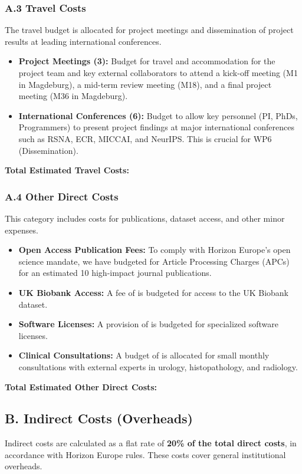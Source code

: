 \subsubsection*{A.3 Travel Costs}
The travel budget is allocated for project meetings and dissemination of project results at leading international conferences.
\begin{itemize}
    \item \textbf{Project Meetings (3):} Budget for travel and accommodation for the project team and key external collaborators to attend a kick-off meeting (M1 in Magdeburg), a mid-term review meeting (M18), and a final project meeting (M36 in Magdeburg).
    \item \textbf{International Conferences (6):} Budget to allow key personnel (PI, PhDs, Programmers) to present project findings at major international conferences such as RSNA, ECR, MICCAI, and NeurIPS. This is crucial for WP6 (Dissemination).
\end{itemize}

\textbf{Total Estimated Travel Costs: }

\subsubsection*{A.4 Other Direct Costs}
This category includes costs for publications, dataset access, and other minor expenses.
\begin{itemize}
    \item \textbf{Open Access Publication Fees:} To comply with Horizon Europe's open science mandate, we have budgeted for Article Processing Charges (APCs) for an estimated 10 high-impact journal publications.
    \item \textbf{UK Biobank Access:} A fee of  is budgeted for access to the UK Biobank dataset.
    \item \textbf{Software Licenses:} A provision of  is budgeted for specialized software licenses.
    \item \textbf{Clinical Consultations:} A budget of  is allocated for small monthly consultations with external experts in urology, histopathology, and radiology.
\end{itemize}

\textbf{Total Estimated Other Direct Costs: }

\subsection*{B. Indirect Costs (Overheads)}
Indirect costs are calculated as a flat rate of \textbf{20\% of the total direct costs}, in accordance with Horizon Europe rules. These costs cover general institutional overheads.

